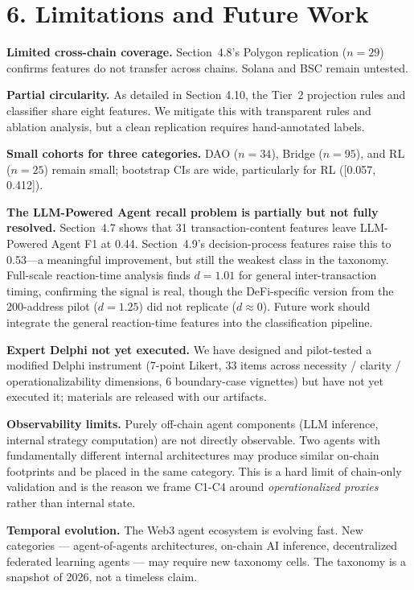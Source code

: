 \documentclass[sigconf,nonacm=false]{acmart}
\begin{document}
\section{6. Limitations and Future Work}

\textbf{Limited cross-chain coverage.} Section~4.8's Polygon replication ($n = 29$) confirms features do not transfer across chains. Solana and BSC remain untested.

\textbf{Partial circularity.} As detailed in Section 4.10, the Tier~2 projection rules and classifier share eight features. We mitigate this with transparent rules and ablation analysis, but a clean replication requires hand-annotated labels.

\textbf{Small cohorts for three categories.} DAO ($n{=}34$), Bridge ($n{=}95$), and RL ($n{=}25$) remain small; bootstrap CIs are wide, particularly for RL ([0.057, 0.412]).

\textbf{The LLM-Powered Agent recall problem is partially but not fully resolved.} Section~4.7 shows that 31 transaction-content features leave LLM-Powered Agent F1 at 0.44. Section~4.9's decision-process features raise this to 0.53---a meaningful improvement, but still the weakest class in the taxonomy. Full-scale reaction-time analysis finds $d{=}1.01$ for general inter-transaction timing, confirming the signal is real, though the DeFi-specific version from the 200-address pilot ($d{=}1.25$) did not replicate ($d{\approx}0$). Future work should integrate the general reaction-time features into the classification pipeline.

\textbf{Expert Delphi not yet executed.} We have designed and pilot-tested a modified Delphi instrument (7-point Likert, 33 items across necessity / clarity / operationalizability dimensions, 6 boundary-case vignettes) but have not yet executed it; materials are released with our artifacts.

\textbf{Observability limits.} Purely off-chain agent components (LLM inference, internal strategy computation) are not directly observable. Two agents with fundamentally different internal architectures may produce similar on-chain footprints and be placed in the same category. This is a hard limit of chain-only validation and is the reason we frame C1-C4 around \textit{operationalized proxies} rather than internal state.

\textbf{Temporal evolution.} The Web3 agent ecosystem is evolving fast. New categories --- agent-of-agents architectures, on-chain AI inference, decentralized federated learning agents --- may require new taxonomy cells. The taxonomy is a snapshot of 2026, not a timeless claim.
\end{document}
